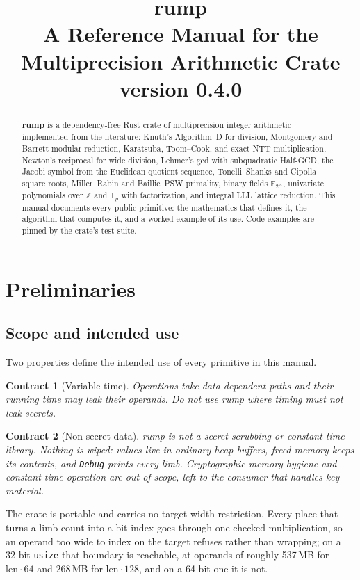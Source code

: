 \documentclass[11pt]{article}
\title{\textbf{rump}\\[0.4ex]\large A Reference Manual for the Multiprecision
Arithmetic Crate\\[0.4ex]\normalsize version 0.4.0}
\author{}
\date{}
\newtheorem{contract}{Contract}[section]
\newcommand{\code}[1]{\texttt{#1}}
\newcommand{\Z}{\mathbb{Z}}
\newcommand{\F}{\mathbb{F}}
\begin{document}
\maketitle

\begin{abstract}
\noindent
\textbf{rump} is a dependency-free Rust crate of multiprecision integer
arithmetic implemented from the literature: Knuth's Algorithm~D for division,
Montgomery and Barrett modular reduction, Karatsuba, Toom--Cook, and exact
NTT multiplication, Newton's reciprocal for wide division, Lehmer's gcd with
subquadratic Half-GCD, the Jacobi symbol from the Euclidean quotient sequence,
Tonelli--Shanks and Cipolla square roots, Miller--Rabin
and Baillie--PSW primality, binary fields $\F_{2^m}$, univariate polynomials
over $\Z$ and $\F_p$ with factorization, and integral LLL lattice reduction.
This manual documents every public primitive: the mathematics that defines
it, the algorithm that computes it, and a worked example of its use. Code
examples are pinned by the crate's test suite.
\end{abstract}

\tableofcontents

\section{Preliminaries}

\subsection{Scope and intended use}

Two properties define the intended use of every primitive in this manual.

\begin{contract}[Variable time]
Operations take data-dependent paths and their running time may leak their
operands. Do not use rump where timing must not leak secrets.
\end{contract}

\begin{contract}[Non-secret data]
rump is not a secret-scrubbing or constant-time library. Nothing is wiped:
values live in ordinary heap buffers, freed memory keeps its contents, and
\code{Debug} prints every limb. Cryptographic memory hygiene and
constant-time operation are out of scope, left to the consumer that handles
key material.
\end{contract}

The crate is portable and carries no target-width restriction. Every place
that turns a limb count into a bit index goes through one checked
multiplication, so an operand too wide to index on the target refuses rather
than wrapping; on a 32-bit \code{usize} that boundary is reachable, at
operands of roughly 537\,MB for $\mathrm{len}\cdot 64$ and 268\,MB for
$\mathrm{len}\cdot 128$, and on a 64-bit one it is not.
\end{document}
